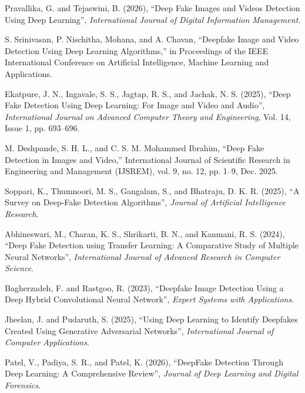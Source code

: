 \documentclass[12pt,a4paper]{report}
\begin{document}
\begin{enumerate}[label={[\arabic*]}]
\item Pravallika, G. and Tejaswini, B. (2026), ``Deep Fake Images and Videos Detection Using Deep Learning'', \textit{International Journal of Digital Information Management}.

\item S. Srinivasan, P. Nischitha, Mohana, and A. Chavan, “Deepfake Image and Video Detection Using Deep Learning Algorithms,” in Proceedings of the IEEE International Conference on Artificial Intelligence, Machine Learning and Applications.

\item Ekatpure, J. N., Ingavale, S. S., Jagtap, R. S., and Jachak, N. S. (2025), ``Deep Fake Detection Using Deep Learning: For Image and Video and Audio'', \textit{International Journal on Advanced Computer Theory and Engineering}, Vol. 14, Issue 1, pp. 693--696.

\item M. Deshpande, S. H. L., and C. S. M. Mohammed Ibrahim, “Deep Fake Detection in Images and Video,” International Journal of Scientific Research in Engineering and Management (IJSREM), vol. 9, no. 12, pp. 1–9, Dec. 2025.

\item Soppari, K., Thumnoori, M. S., Gangalam, S., and Bhatraju, D. K. R. (2025), ``A Survey on Deep-Fake Detection Algorithms'', \textit{Journal of Artificial Intelligence Research}.

\item Abhineswari, M., Charan, K. S., Shrikarti, B. N., and Kanmani, R. S. (2024), ``Deep Fake Detection using Transfer Learning: A Comparative Study of Multiple Neural Networks'', \textit{International Journal of Advanced Research in Computer Science}.

\item Bagherzadeh, F. and Rastgoo, R. (2023), ``Deepfake Image Detection Using a Deep Hybrid Convolutional Neural Network'', \textit{Expert Systems with Applications}.

\item Jheelan, J. and Pudaruth, S. (2025), ``Using Deep Learning to Identify Deepfakes Created Using Generative Adversarial Networks'', \textit{International Journal of Computer Applications}.

\item Patel, V., Padiya, S. R., and Patel, K. (2026), ``DeepFake Detection Through Deep Learning: A Comprehensive Review'', \textit{Journal of Deep Learning and Digital Forensics}.


\end{enumerate}
\end{document}
